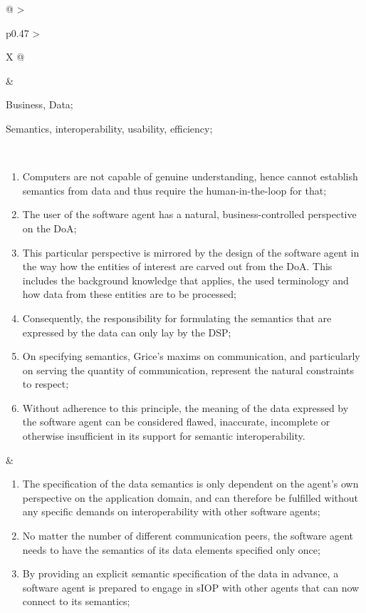 \begin{xltabular}[l]{\linewidth}{@{} >{\small\raggedright\arraybackslash}p{0.47\linewidth} >{\small\raggedright\arraybackslash}X @{}}
\begin{mmdp}
\end{mmdp}
&
\begin{description}[labelwidth=3.7cm,leftmargin=3.7cm+1ex,nosep,topsep=2ex,labelsep=1ex,font=\bfseries]
  \item[Type of information:] Business, Data;
  \item[Quality attributes:] Semantics, interoperability, usability, efficiency;
\end{description} \\
\begin{enumerate}[left=6pt, nosep]
  \item Computers are not capable of genuine understanding, hence cannot establish semantics from data and thus require the human-in-the-loop for that;
  \item The user of the software agent has a natural, business-controlled perspective on the DoA;
  \item This particular perspective is mirrored by the design of the software agent in the way how the entities of interest are carved out from the DoA. This includes the background knowledge that applies, the used terminology and how data from these entities are to be processed;
  \item Consequently, the responsibility for formulating the semantics that are expressed by the data can only lay by the DSP;
  \item On specifying semantics, Grice’s maxims on communication, and particularly on serving the quantity of communication, represent the natural constraints to respect;
  \item Without adherence to this principle, the meaning of the data expressed by the software agent can be considered flawed, inaccurate, incomplete or otherwise insufficient in its support for semantic interoperability.
\end{enumerate}
&
\begin{enumerate}[left=10pt, nosep]
  \item The specification of the data semantics is only dependent on the agent’s own perspective on the application domain, and can therefore be fulfilled without any specific demands on interoperability with other software agents;
  \item No matter the number of different communication peers, the software agent needs to have the semantics of its data elements specified only once;
  \item By providing an explicit semantic specification of the data in advance, a software agent is prepared to engage in sIOP with other agents that can now connect to its semantics;

\end{enumerate}
\end{xltabular}
